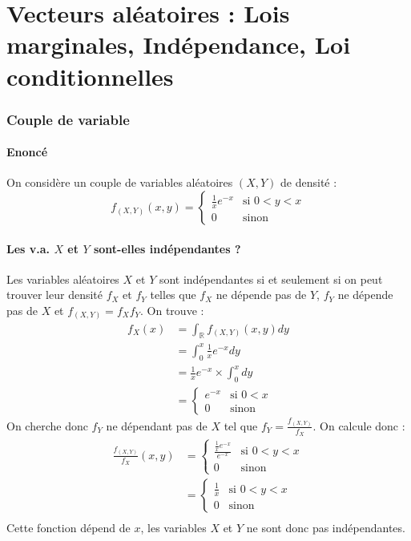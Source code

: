 \documentclass[10pt,a4paper,twoside]{article}
\begin{document}
\newpage
\part{Vecteurs aléatoires : Lois marginales, Indépendance, Loi conditionnelles}
\setcounter{section}{0}
\section{Couple de variable}
\subsection*{Enoncé}
On considère un couple de variables aléatoires $(X,Y)$ de densité :
\[ f_{(X,Y)}(x,y) = 
\left\lbrace \begin{array}{ll}
\frac{1}{x}e^{-x} & \text{si }0<y<x\\
0 & \text{sinon}
\end{array}\right.
\]

\subsection{Les v.a. $X$ et $Y$ sont-elles indépendantes ?}
Les variables aléatoires $X$ et $Y$ sont indépendantes si et seulement si on peut trouver leur densité $f_{X}$ et $f_{Y}$ telles que $f_{X}$ ne dépende pas de $Y$, $f_{Y}$ ne dépende pas de $X$ et $f_{(X,Y)}=f_{X}f_{Y}$. On trouve :
\begin{align*}
f_{X}(x) &= \int_{\mathbb{R}}f_{(X,Y)}(x,y) dy \\
&= \int_{0}^{x} \frac{1}{x}e^{-x} dy\\
&= \frac{1}{x}e^{-x} \times \int_{0}^{x}dy\\
&= \left\lbrace \begin{array}{ll}
e^{-x} & \text{si }0<x\\
0 & \text{sinon}
\end{array}\right.
\end{align*}
On cherche donc $f_{Y}$ ne dépendant pas de $X$ tel que $f_{Y}=\frac{f_{(X,Y)}}{f_{X}}$. On calcule donc :
\begin{align*}
\frac{f_{(X,Y)}}{f_{X}}(x,y) &= \left\lbrace \begin{array}{ll}
\frac{\frac{1}{x}e^{-x}}{e^{-x}} & \text{si }0<y<x\\
0 & \text{sinon}
\end{array}\right.\\
&= \left\lbrace \begin{array}{ll}
\frac{1}{x} & \text{si }0<y<x\\
0 & \text{sinon}
\end{array}\right.\\
\end{align*}
Cette fonction dépend de $x$, les variables $X$ et $Y$ ne sont donc pas indépendantes.
\end{document}
